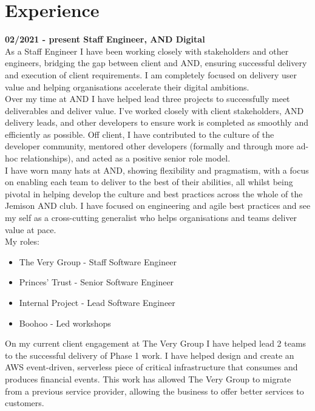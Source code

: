 \section{Experience}

\textbf{02/2021 - present \hspace{2.75em}Staff Engineer, AND Digital}\\

As a Staff Engineer I have been working closely with stakeholders and other engineers, bridging the gap between client and AND, ensuring successful delivery and execution of client requirements. I am completely focused on delivery user value and helping organisations accelerate their digital ambitions.\\

Over my time at AND I have helped lead three projects to successfully meet deliverables and deliver value. I’ve worked closely with client stakeholders, AND delivery leads, and other developers to ensure work is completed as smoothly and efficiently as possible. Off client, I have contributed to the culture of the developer community, mentored other developers (formally and through more ad-hoc relationships), and acted as a positive senior role model.\\

I have worn many hats at AND, showing flexibility and pragmatism, with a focus on enabling each team to deliver to the best of their abilities, all whilst being pivotal in helping develop the culture and best practices across the whole of the Jemison AND club. I have focused on engineering and agile best practices and see my self as a cross-cutting generalist who helps organisations and teams deliver value at pace.\\

My roles:\\

\begin{itemize}
  \item The Very Group   - Staff Software Engineer
  \item Princes' Trust   - Senior Software Engineer
  \item Internal Project - Lead Software Engineer
  \item Boohoo           - Led workshops
\end{itemize}

\bigskip

On my current client engagement at The Very Group I have helped lead 2 teams to the successful delivery of Phase 1 work. I have helped design and create an AWS event-driven, serverless piece of critical infrastructure that consumes and produces financial events. This work has allowed The Very Group to migrate from a previous service provider, allowing the business to offer better services to customers.\\

